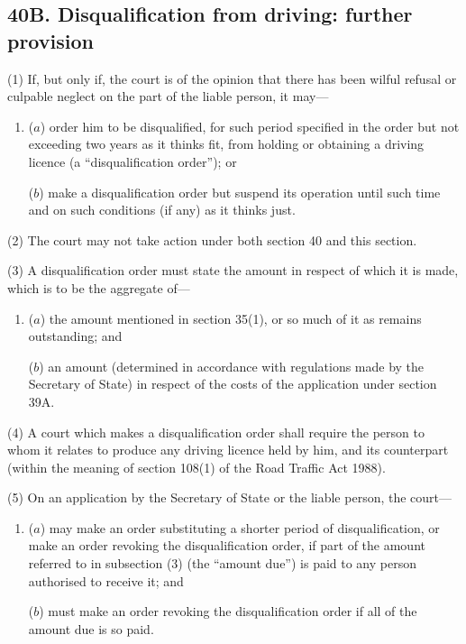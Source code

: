 \documentclass[a4paper]{article}
\begin{document}
\subsection{40B. Disqualification from driving: further provision}

(1) If, but only if, the court is of the opinion that there has been wilful
refusal or culpable neglect on the part of the liable person, it may---
\begin{enumerate}\item[]
 ($a$) order him to be disqualified, for such period specified in the order but not
exceeding two years as it thinks fit, from holding or obtaining a driving
licence (a “disqualification order”); or

($b$) make a disqualification order but suspend its operation until such time and
on such conditions (if any) as it thinks just.
\end{enumerate}

(2) The court may not take action under both section 40 and this section.

(3) A disqualification order must state the amount in respect of which it is made,
which is to be the aggregate of---
\begin{enumerate}\item[]
($a$) the amount mentioned in section 35(1), or so much of it as remains
outstanding; and

($b$) an amount (determined in accordance with regulations made by the Secretary
of State) in respect of the costs of the application under section 39A.
\end{enumerate}

(4) A court which makes a disqualification order shall require the person to whom
it relates to produce any driving licence held by him, and its counterpart (within the
meaning of section 108(1) of the Road Traffic Act 1988).

(5) On an application by the Secretary of State or the liable person, the court---
\begin{enumerate}\item[]
($a$) may make an order substituting a shorter period of disqualification, or make an order revoking the disqualification order, if part of the amount referred to in subsection (3) (the “amount due”) is paid to any person authorised to receive it; and

($b$) must make an order revoking the disqualification order if all of the amount due is so paid.
\end{enumerate}
\end{document}
